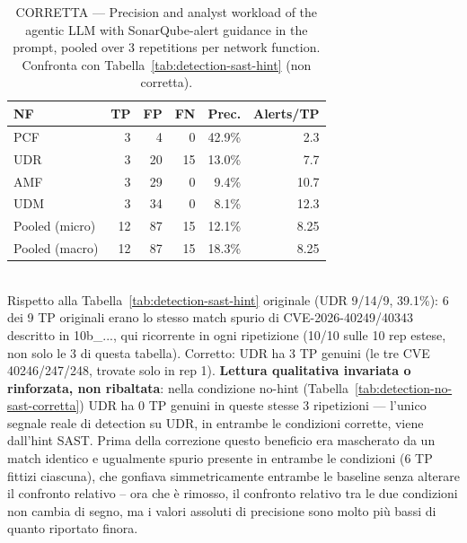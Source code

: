%

\begin{table}[t]
\centering
\caption{CORRETTA — Precision and analyst workload of the agentic LLM with SonarQube-alert guidance in the prompt, pooled over 3 repetitions per network function. Confronta con Tabella~\ref{tab:detection-sast-hint} (non corretta).}
\label{tab:detection-sast-hint-corretta}
\begin{tabular}{lrrrrr}
\toprule
NF & TP & FP & FN & Prec. & Alerts/TP \\
\midrule
PCF & 3  & 4  & 0  & 42.9\% & 2.3 \\
UDR & 3  & 20 & 15 & 13.0\% & 7.7 \\
AMF & 3  & 29 & 0  & 9.4\%  & 10.7 \\
UDM & 3  & 34 & 0  & 8.1\%  & 12.3 \\
\midrule
Pooled (micro) & 12 & 87 & 15 & 12.1\% & 8.25 \\
Pooled (macro) & 12 & 87 & 15 & 18.3\% & 8.25 \\
\bottomrule
\end{tabular}
\\[2pt]
\footnotesize{Rispetto alla Tabella~\ref{tab:detection-sast-hint} originale (UDR 9/14/9, 39.1\%): 6 dei 9 TP originali erano lo stesso match spurio di CVE-2026-40249/40343 descritto in 10b\_..., qui ricorrente in ogni ripetizione (10/10 sulle 10 rep estese, non solo le 3 di questa tabella). Corretto: UDR ha 3 TP genuini (le tre CVE 40246/247/248, trovate solo in rep 1). \textbf{Lettura qualitativa invariata o rinforzata, non ribaltata}: nella condizione no-hint (Tabella~\ref{tab:detection-no-sast-corretta}) UDR ha 0 TP genuini in queste stesse 3 ripetizioni — l'unico segnale reale di detection su UDR, in entrambe le condizioni corrette, viene dall'hint SAST. Prima della correzione questo beneficio era mascherato da un match identico e ugualmente spurio presente in entrambe le condizioni (6 TP fittizi ciascuna), che gonfiava simmetricamente entrambe le baseline senza alterare il confronto relativo -- ora che è rimosso, il confronto relativo tra le due condizioni non cambia di segno, ma i valori assoluti di precisione sono molto più bassi di quanto riportato finora.}
\end{table}
